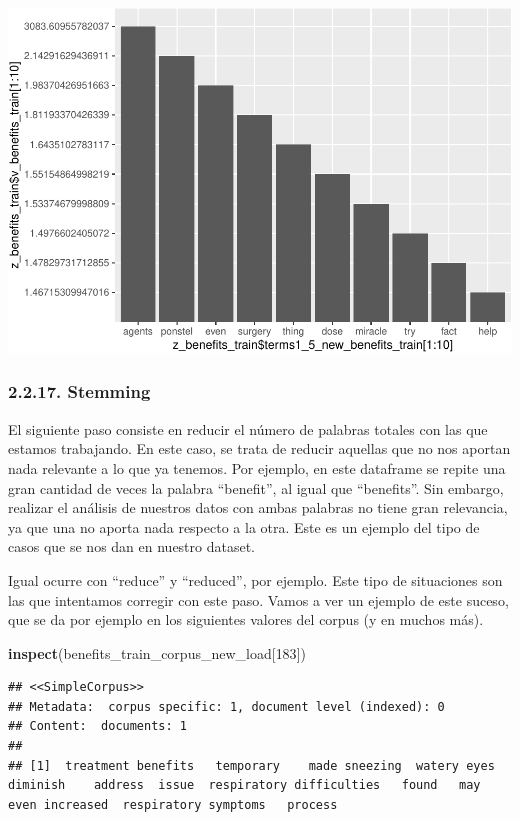 \documentclass[spanish,]{article}
\newenvironment{Shaded}{\begin{snugshade}}{\end{snugshade}}
\newcommand{\KeywordTok}[1]{\textcolor[rgb]{0.13,0.29,0.53}{\textbf{#1}}}
\newcommand{\DecValTok}[1]{\textcolor[rgb]{0.00,0.00,0.81}{#1}}
\newcommand{\NormalTok}[1]{#1}
\begin{document}
\includegraphics{practica-original_files/figure-latex/unnamed-chunk-60-1.pdf}

\subsubsection{2.2.17. Stemming}\label{stemming}

El siguiente paso consiste en reducir el número de palabras totales con
las que estamos trabajando. En este caso, se trata de reducir aquellas
que no nos aportan nada relevante a lo que ya tenemos. Por ejemplo, en
este dataframe se repite una gran cantidad de veces la palabra
``benefit'', al igual que ``benefits''. Sin embargo, realizar el
análisis de nuestros datos con ambas palabras no tiene gran relevancia,
ya que una no aporta nada respecto a la otra. Este es un ejemplo del
tipo de casos que se nos dan en nuestro dataset.

Igual ocurre con ``reduce'' y ``reduced'', por ejemplo. Este tipo de
situaciones son las que intentamos corregir con este paso. Vamos a ver
un ejemplo de este suceso, que se da por ejemplo en los siguientes
valores del corpus (y en muchos más).

\begin{Shaded}
\begin{Highlighting}[]
\KeywordTok{inspect}\NormalTok{(benefits_train_corpus_new_load[}\DecValTok{183}\NormalTok{])}
\end{Highlighting}
\end{Shaded}

\begin{verbatim}
## <<SimpleCorpus>>
## Metadata:  corpus specific: 1, document level (indexed): 0
## Content:  documents: 1
## 
## [1]  treatment benefits   temporary    made sneezing  watery eyes diminish    address  issue  respiratory difficulties   found   may  even increased  respiratory symptoms   process
\end{verbatim}
\end{document}
